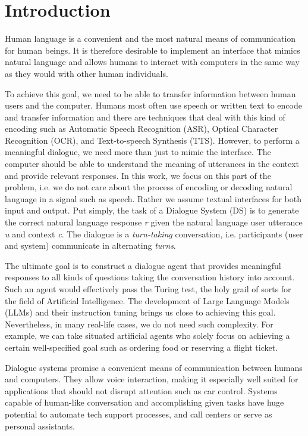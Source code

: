 \chapter{Introduction}%
\label{chap:intro}
Human language is a convenient and the most natural means of communication for human beings.
It is therefore desirable to implement an interface that mimics natural language and allows humans to interact with computers in the same way as they would with other human individuals.

To achieve this goal, we need to be able to transfer information between human users and the computer.
Humans most often use speech or written text to encode and transfer information and there are techniques that deal with this kind of encoding such as Automatic Speech Recognition (ASR), Optical Character Recognition (OCR), and Text-to-speech Synthesis (TTS).
However, to perform a meaningful dialogue, we need more than just to mimic the interface.
The computer should be able to understand the meaning of utterances in the context and provide relevant responses.
In this work, we focus on this part of the problem, i.e. we do not care about the process of encoding or decoding natural language in a signal such as speech.
Rather we assume textual interfaces for both input and output.
Put simply, the task of a Dialogue System (DS) is to generate the correct natural language response \textit{r} given the natural language user utterance \textit{u} and context \textit{c}.
The dialogue is a \textit{turn-taking} conversation, i.e. participants (user and system) communicate in alternating \textit{turns}.

The ultimate goal is to construct a dialogue agent that provides meaningful responses to all kinds of questions taking the conversation history into account.
Such an agent would effectively pass the Turing test, the holy grail of sorts for the field of Artificial Intelligence.
The development of Large Language Models (LLMs) and their instruction tuning brings us close to achieving this goal.
Nevertheless, in many real-life cases, we do not need such complexity.
For example, we can take situated artificial agents who solely focus on achieving a certain well-specified goal such as ordering food or reserving a flight ticket.

Dialogue systems promise a convenient means of communication between humans and computers.
They allow voice interaction, making it especially well suited for applications that should not disrupt attention such as car control.
Systems capable of human-like conversation and accomplishing given tasks have huge potential to automate tech support processes, and call centers or serve as personal assistants.

